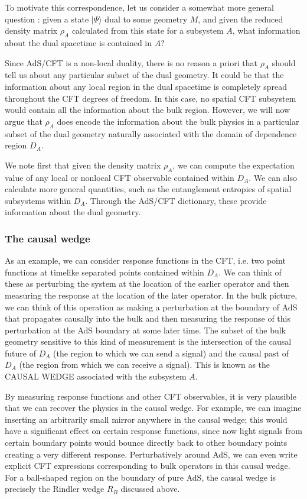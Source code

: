 \documentclass[12pt,epsf]{article}
\begin{document}
To motivate this correspondence, let us consider a somewhat more general question \cite{Bousso:2012sj,Czech:2012bh,Hubeny:2012wa}: given a state $|\Psi \rangle$ dual to some geometry $M$, and given the reduced density matrix $\rho_A$ calculated from this state for a subsystem $A$, what information about the dual spacetime is contained in $A$?

Since AdS/CFT is a non-local duality, there is no reason a priori that $\rho_A$ should tell us about any particular subset of the dual geometry. It could be that the information about any local region in the dual spacetime is completely spread throughout the CFT degrees of freedom. In this case, no spatial CFT subsystem would contain all the information about the bulk region. However, we will now argue that $\rho_A$ does encode the information about the bulk physics in a particular subset of the dual geometry naturally associated with the domain of dependence region $D_A$.

We note first that given the density matrix $\rho_A$, we can compute the expectation value of any local or nonlocal CFT observable contained within $D_A$. We can also calculate more general quantities, such as the entanglement entropies of spatial subsystems within $D_A$. Through the AdS/CFT dictionary, these provide information about the dual geometry.

\subsubsection*{The causal wedge}

As an example, we can consider response functions in the CFT, i.e. two point functions at timelike separated points contained within $D_A$. We can think of these as perturbing the system at the location of the earlier operator and then measuring the response at the location of the later operator. In the bulk picture, we can think of this operation as making a perturbation at the boundary of AdS that propagates causally into the bulk and then measuring the response of this perturbation at the AdS boundary at some later time. The subset of the bulk geometry sensitive to this kind of measurement is the intersection of the causal future of $D_A$ (the region to which we can send a signal) and the causal past of $D_A$ (the region from which we can receive a signal). This is known as the CAUSAL WEDGE associated with the subsystem $A$.

By measuring response functions and other CFT observables, it is very plausible that we can recover the physics in the causal wedge. For example, we can imagine inserting an arbitrarily small mirror anywhere in the causal wedge; this would have a significant effect on certain response functions, since now light signals from certain boundary points would bounce directly back to other boundary points creating a very different response. Perturbatively around AdS, we can even write explicit CFT expressions corresponding to bulk operators in this causal wedge. For a ball-shaped region on the boundary of pure AdS, the causal wedge is precisely the Rindler wedge $R_B$ discussed above.
\end{document}
